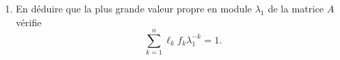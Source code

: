 \begin{enumerate}
{$$\begin{array}{cccccc}
            0 & s_2 & \ddots & \ddots & \vdots \\
            \vdots & \vdots & \ddots & \ddots & 0 \\
            0 & \cdots & 0 & s_{n-1} & -\lambda \\
          \end{array}\right|
  $$ 
  par rapport à la première ligne sont
  \begin{align*}
  (f_1 - \lambda) |B_1| & = (f_1-\lambda) (-\lambda^{n-1}), &
  - f_2 |B_2| & = -f_2 s_1 (-\lambda)^{n-2}, \\
  f_3 |B_3| & = f_3 s_1 s_2 (-\lambda)^{n-3}, & 
  -f_4 |B_4| & = -f_4 s_1 s_2 s_3 (-\lambda)^{n-4}, \qquad \dots
  \end{align*}
  }
  \item En déduire que la plus grande valeur propre en module $\lambda_1$ de la matrice $A$ vérifie
  $$
  \sum_{k=1}^n \ell_k f_k \lambda_1^{-k} = 1.
  $$
\end{enumerate}

